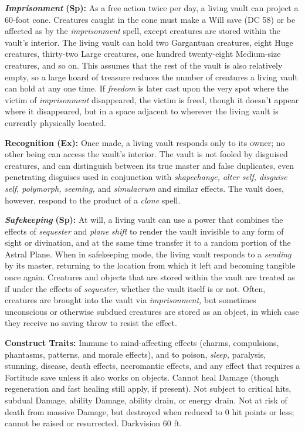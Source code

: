 \documentclass{article}
\begin{document}
{\textit{\textbf{Imprisonment }}\textbf{(Sp):} As a free action twice per day, a 
living vault can project a 60-foot cone. Creatures caught in the cone must make 
a Will save (DC 58) or be affected as by the \textit{imprisonment }spell, except 
creatures are stored within the vault's interior. The living vault can hold two 
Gargantuan creatures, eight Huge creatures, thirty-two Large creatures, one hundred 
twenty-eight Medium-size creatures, and so on. This assumes that the rest of the 
vault is also relatively empty, so a large hoard of treasure reduces the number 
of creatures a living vault can hold at any one time. If \textit{freedom }is later 
cast upon the very spot where the victim of \textit{imprisonment }disappeared, 
the victim is freed, though it doesn't appear where it disappeared, but in a space 
adjacent to wherever the living vault is currently physically located. 

\textbf{Recognition (Ex):} Once made, a living vault responds only to its owner; 
no other being can access the vault's interior. The vault is not fooled by disguised 
creatures, and can distinguish between its true master and false duplicates, even 
penetrating disguises used in conjunction with \textit{shapechange, alter self, 
disguise self, polymorph, seeming, }and \textit{simulacrum }and similar effects. 
The vault does, however, respond to the product of a \textit{clone }spell. 

\textit{\textbf{Safekeeping }}\textbf{(Sp):} At will, a living vault can use a 
power that combines the effects of \textit{sequester }and \textit{plane shift }to 
render the vault invisible to any form of sight or divination, and at the same 
time transfer it to a random portion of the Astral Plane. When in safekeeping mode, 
the living vault responds to a \textit{sending }by its master, returning to the 
location from which it left and becoming tangible once again. Creatures and objects 
that are stored within the vault are treated as if under the effects of \textit{sequester, 
}whether the vault itself is or not. Often, creatures are brought into the vault 
via \textit{imprisonment, }but sometimes unconscious or otherwise subdued creatures 
are stored as an object, in which case they receive no saving throw to resist the 
effect. 

\textbf{Construct Traits:} Immune to mind-affecting effects (charms, compulsions, 
phantasms, patterns, and morale effects), and to poison, \textit{sleep, }paralysis, 
stunning, disease, death effects, necromantic effects, and any effect that requires 
a Fortitude save unless it also works on objects. Cannot heal Damage (though regeneration 
and fast healing still apply, if present). Not subject to critical hits, subdual 
Damage, ability Damage, ability drain, or energy drain. Not at risk of death from 
massive Damage, but destroyed when reduced to 0 hit points or less; cannot be raised 
or resurrected. Darkvision 60 ft. 

}
\end{document}
